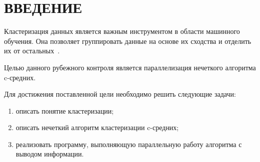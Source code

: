 \chapter*{ВВЕДЕНИЕ}

Кластеризация данных является важным инструментом в области машинного обучения.
Она позволяет группировать данные на основе их сходства и отделить их от остальных~\cite{inro-clust}. 

Целью данного рубежного контроля является параллелизация нечеткого алгоритма c-средних.

Для достижения поставленной цели необходимо решить следующие задачи:
\begin{enumerate}
	\item описать понятие кластеризации;
	\item описать нечеткий алгоритм кластеризации c-средних;
	\item реализовать программу, выполняющую параллельную работу алгоритма с выводом информации.
\end{enumerate}